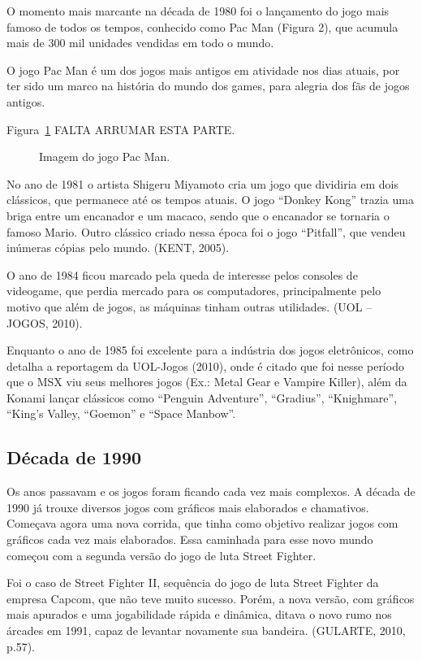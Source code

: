 O momento mais marcante na década de 1980 foi o lançamento do jogo mais famoso de todos os tempos, conhecido como Pac Man (Figura 2), que acumula mais de 300 mil unidades vendidas em todo o mundo.  

O jogo Pac Man é um dos jogos mais antigos em atividade nos dias atuais, por ter sido um marco na história do mundo dos games, para alegria dos fãs de jogos antigos.

Figura~\ref{f1.2} FALTA ARRUMAR ESTA PARTE.
\begin{figure}[!hbp]
\makebox[\textwidth]{\framebox[5cm]{\rule{0pt}{5cm}}}
\caption{Imagem do jogo Pac Man.} \label{f1.2}
\end{figure}

No ano de 1981 o artista Shigeru Miyamoto cria um jogo que dividiria em dois clássicos, que permanece até os tempos atuais. O jogo “Donkey Kong” trazia uma briga entre um encanador e um macaco, sendo que o encanador se tornaria o famoso Mario. Outro clássico criado nessa época foi o jogo “Pitfall”, que vendeu inúmeras cópias pelo mundo. (KENT, 2005).

O ano de 1984 ficou marcado pela queda de interesse pelos consoles de videogame, que perdia mercado para os computadores, principalmente pelo motivo que além de jogos, as máquinas tinham outras utilidades. (UOL – JOGOS, 2010).

Enquanto o ano de 1985 foi excelente para a indústria dos jogos eletrônicos, como detalha a reportagem da UOL-Jogos (2010), onde é citado que foi nesse período que o MSX viu seus melhores jogos (Ex.: Metal Gear e Vampire Killer), além da Konami lançar clássicos como “Penguin Adventure”, “Gradius”, “Knighmare”, “King’s Valley, “Goemon” e “Space Manbow”.

\subsection{Década de 1990}

Os anos passavam e os jogos foram ficando cada vez mais complexos. A década de 1990 já trouxe diversos jogos com gráficos mais elaborados e chamativos. Começava agora uma nova corrida, que tinha como objetivo realizar jogos com gráficos cada vez mais elaborados. Essa caminhada para esse novo mundo começou com a segunda versão do jogo de luta Street Fighter.

\begin{citacao}
Foi o caso de Street Fighter II, sequência do jogo de luta Street Fighter da empresa Capcom, que não teve muito sucesso. Porém, a nova versão, com gráficos mais apurados e uma jogabilidade rápida e dinâmica, ditava o novo rumo nos árcades em 1991, capaz de levantar novamente sua bandeira. (GULARTE, 2010, p.57).
\end{citacao}

